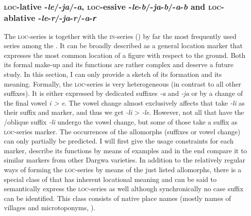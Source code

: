 
\subsubsection{\textsc{loc}-lative -\textit{le}/-\textit{ja}/-\textit{a}, \textsc{loc}-essive -\textit{le}-\textit{b}/-\textit{ja}-\textit{b}/-\textit{a}-\textit{b} and \textsc{loc}-ablative -\textit{le}-\textit{r}/-\textit{ja}-\textit{r}/-\textit{a}-\textit{\texttt{r}}}
\label{sssec:spr-lative -le/-ja/-a, spr-essive -le-b/-ja-b/-a-b and spr-\isi{ablative} -le-r/-ja-r/-a-r} 

The \textsc{loc}-series is together with the \textsc{in}-series () by far the most frequently used series among the . It can be broadly described as a general location marker that expresses the most common location of a figure with respect to the ground. Both its formal make-up and its functions are rather complex and deserve a future study. In this section, I can only provide a sketch of its formation and its meaning. Formally, the \textsc{loc}-series is very heterogeneous (in contrast to all other  suffixes). It is either expressed by dedicated suffixes \textit{-a} and \textit{-ja} or by a change of the final vowel \textit{i > e}. The vowel change almost exclusively affects  that take \textit{-li} as their  suffix and  marker, and thus we get \textit{-li} > \textit{-le}. However, not all  that have the \slash oblique suffix \textit{-li} undergo the vowel change, but some of those  take a suffix as \textsc{loc}-series marker. The occurrences of the allomorphs (suffixes or vowel change) can only partially be predicted. I will first give the usage constraints for each marker, describe its functions by means of examples and in the end compare it to similar markers from other Dargwa varieties. In addition to the relatively regular ways of forming the \textsc{loc}-series by means of the just listed allomorphs, there is a special class of  that has inherent locational meaning and can be said to semantically express the \textsc{loc}-series as well although synchronically no case suffix can be identified. This class consists of native place names (mostly names of villages and microtoponyms, ).

